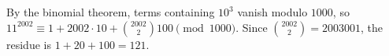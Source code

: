 By the binomial theorem, terms containing $10^3$ vanish modulo $1000$, so $11^{2002}\equiv1+2002\cdot10+\binom{2002}{2}100\pmod{1000}$. Since $\binom{2002}{2}=2003001$, the residue is $1+20+100=\boxed{121}$.
